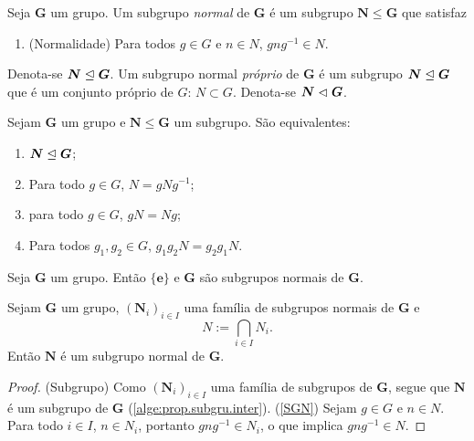 \begin{definition}
Seja $\bm G$ um grupo. Um subgrupo \emph{normal} de $\bm G$ é um subgrupo $\bm N \leq \bm G$ que satisfaz
	\begin{enumerate}[label={SGN\arabic*.}]
	\item \label{SGN} (Normalidade) Para todos $g \in G$ e $n \in N$, $gng^{-1} \in N$.
	\end{enumerate}
\noindent
Denota-se $\bm N \mathrel{\unlhd} \bm G$. Um subgrupo normal \emph{próprio} de $\bm G$ é um subgrupo $\bm N \mathrel{\unlhd} \bm G$ que é um conjunto próprio de $G$: $N \subset G$. Denota-se $\bm N \mathrel{\lhd} \bm G$.
\end{definition}

\begin{proposition}
Sejam $\bm G$ um grupo e $\bm N \leq \bm G$ um subgrupo. São equivalentes:
	\begin{enumerate}
	\item $\bm N \mathrel{\unlhd} \bm G$;
	\item Para todo $g \in G$, $N=gNg^{-1}$;
	\item para todo $g \in G$, $gN=Ng$;
	\item Para todos $g_1,g_2 \in G$, $g_1g_2N = g_2g_1N$.
	\end{enumerate}
\end{proposition}

\begin{proposition}
\label{alge:prop.subgrunor.triv}
Seja $\bm G$ um grupo. Então $\bm{\{e\}}$ e $\bm G$ são subgrupos normais de $\bm G$.
\end{proposition}

\begin{proposition}
\label{alge:prop.subgrunor.inter}
Sejam $\bm G$ um grupo, $(\bm N_i)_{i \in I}$ uma família de subgrupos normais de $\bm G$ e
	\begin{equation*}
	N := \bigcap_{i \in I} N_i.
	\end{equation*}
Então $\bm N$ é um subgrupo normal de $\bm G$.
\end{proposition}
\begin{proof}
(Subgrupo) Como $(\bm N_i)_{i \in I}$ uma família de subgrupos de $\bm G$, segue que $\bm N$ é um subgrupo de $\bm G$ (\ref{alge:prop.subgru.inter}).
(\ref{SGN}) Sejam $g \in G$ e $n \in N$. Para todo $i \in I$, $n \in N_i$, portanto $gng^{-1} \in N_i$, o que implica $gng^{-1} \in N$.
\end{proof}

